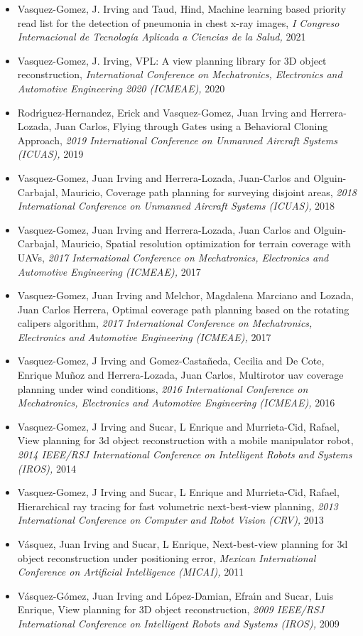 \begin{itemize} 
\item Vasquez-Gomez, J. Irving and Taud, Hind, Machine learning based priority read list for the detection of pneumonia in chest x-ray images, \textit{ I Congreso Internacional de Tecnología Aplicada a Ciencias de la Salud,} 2021 
\item Vasquez-Gomez, J. Irving, VPL: A view planning library for 3D object reconstruction, \textit{ International Conference on Mechatronics, Electronics and Automotive Engineering 2020 (ICMEAE),} 2020 
\item Rodr{\'\i}guez-Hernandez, Erick and Vasquez-Gomez, Juan Irving and Herrera-Lozada, Juan Carlos, Flying through Gates using a Behavioral Cloning Approach, \textit{ 2019 International Conference on Unmanned Aircraft Systems (ICUAS),} 2019 
\item Vasquez-Gomez, Juan Irving and Herrera-Lozada, Juan-Carlos and Olguin-Carbajal, Mauricio, Coverage path planning for surveying disjoint areas, \textit{ 2018 International Conference on Unmanned Aircraft Systems (ICUAS),} 2018 
\item Vasquez-Gomez, Juan Irving and Herrera-Lozada, Juan Carlos and Olguin-Carbajal, Mauricio, Spatial resolution optimization for terrain coverage with UAVs, \textit{ 2017 International Conference on Mechatronics, Electronics and Automotive Engineering (ICMEAE),} 2017 
\item Vasquez-Gomez, Juan Irving and Melchor, Magdalena Marciano and Lozada, Juan Carlos Herrera, Optimal coverage path planning based on the rotating calipers algorithm, \textit{ 2017 International Conference on Mechatronics, Electronics and Automotive Engineering (ICMEAE),} 2017 
\item Vasquez-Gomez, J Irving and Gomez-Casta{\~n}eda, Cecilia and De Cote, Enrique Mu{\~n}oz and Herrera-Lozada, Juan Carlos, Multirotor uav coverage planning under wind conditions, \textit{ 2016 International Conference on Mechatronics, Electronics and Automotive Engineering (ICMEAE),} 2016 
\item Vasquez-Gomez, J Irving and Sucar, L Enrique and Murrieta-Cid, Rafael, View planning for 3d object reconstruction with a mobile manipulator robot, \textit{ 2014 IEEE/RSJ International Conference on Intelligent Robots and Systems (IROS),} 2014 
\item Vasquez-Gomez, J Irving and Sucar, L Enrique and Murrieta-Cid, Rafael, Hierarchical ray tracing for fast volumetric next-best-view planning, \textit{ 2013 International Conference on Computer and Robot Vision (CRV),} 2013 
\item V{\'a}squez, Juan Irving and Sucar, L Enrique, Next-best-view planning for 3d object reconstruction under positioning error, \textit{ Mexican International Conference on Artificial Intelligence (MICAI),} 2011 
\item V{\'a}squez-G{\'o}mez, Juan Irving and L{\'o}pez-Damian, Efra{\'\i}n and Sucar, Luis Enrique, View planning for 3D object reconstruction, \textit{ 2009 IEEE/RSJ International Conference on Intelligent Robots and Systems (IROS),} 2009 
\end{itemize} 
